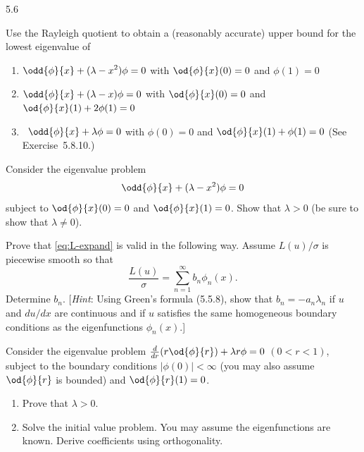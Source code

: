 \begin{exercises}{5.6}

\item Use the Rayleigh quotient to obtain a (reasonably accurate) upper bound for the lowest eigenvalue of
\begin{enumerate}
\item $\displaystyle\odd{\phi}{x} + (\lambda - x^2)\phi = 0$ with $\displaystyle\od{\phi}{x}(0) = 0$ and $\phi(1) = 0$
\item $\displaystyle\odd{\phi}{x} + (\lambda - x)\phi = 0$ with $\displaystyle\od{\phi}{x}(0) = 0$ and $\displaystyle\od{\phi}{x}(1) + 2\phi(1) = 0$
\item\starred\ $\displaystyle\odd{\phi}{x} + \lambda\phi = 0$ with $\phi(0) = 0$ and $\displaystyle\od{\phi}{x}(1) + \phi(1) = 0$ (See Exercise~5.8.10.)
\end{enumerate}

\item Consider the eigenvalue problem
\[
\odd{\phi}{x} + (\lambda - x^2)\phi = 0
\]
subject to $\od{\phi}{x}(0) = 0$ and $\od{\phi}{x}(1) = 0$.  Show that $\lambda > 0$ (be sure to show that $\lambda \neq 0$).

\item Prove that \eqref{eq:L-expand} is valid in the following way.  Assume $L(u)/\sigma$ is piecewise smooth so that
\[
\frac{L(u)}{\sigma} = \sum_{n=1}^{\infty} b_n\phi_n(x).
\]
Determine $b_n$.  [\textit{Hint}: Using Green's formula (5.5.8), show that $b_n = -a_n\lambda_n$ if $u$ and $du/dx$ are continuous and if $u$ satisfies the same homogeneous boundary conditions as the eigenfunctions $\phi_n(x)$.]

\item Consider the eigenvalue problem $\frac{d}{d r}(r\od{\phi}{r}) + \lambda r\phi = 0$ $(0 < r < 1)$, subject to the boundary conditions $|\phi(0)| < \infty$ (you may also assume $\od{\phi}{r}$ is bounded) and $\od{\phi}{r}(1) = 0$.
\begin{enumerate}
\item Prove that $\lambda > 0$.
\item Solve the initial value problem.  You may assume the eigenfunctions are known.  Derive coefficients using orthogonality.
\end{enumerate}

\end{exercises}
